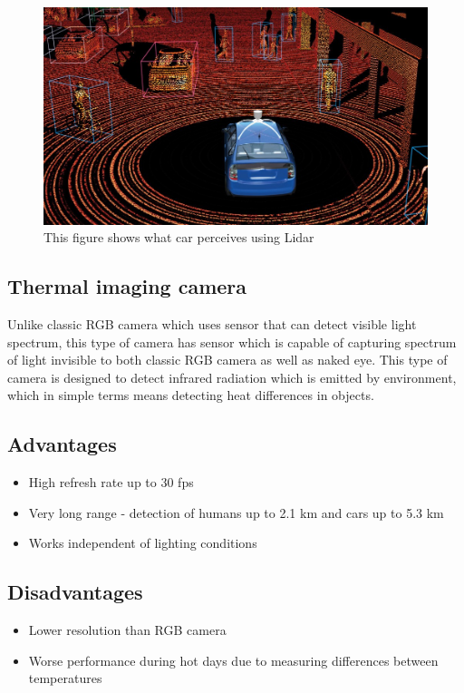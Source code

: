  \begin{figure}[H]
\centering
\includegraphics[width=\textwidth]{Figures/ConAnalysis/General/Lidar.jpeg}
\caption{This figure shows what car perceives using Lidar\cite{1vrB0Jrb84:online}}
\end{figure}
 
 \color{blue}

\subsection{Thermal imaging camera}
Unlike classic RGB camera which uses sensor that can detect visible light spectrum, this type of camera has sensor which is capable of capturing spectrum of light invisible to both classic RGB camera as well as naked eye. This type of camera is designed to detect infrared radiation which is emitted by environment, which in simple terms means detecting heat differences in objects. 

\subsection*{Advantages}
\begin{itemize}
  \item High refresh rate up to 30 fps
  \item Very long range - detection of humans up to 2.1 km and cars up to 5.3 km
  \item Works independent of lighting conditions
\end{itemize}

\subsection*{Disadvantages}
\begin{itemize}
  \item Lower resolution than RGB camera
  \item Worse performance during hot days due to measuring differences between temperatures
\end{itemize}

